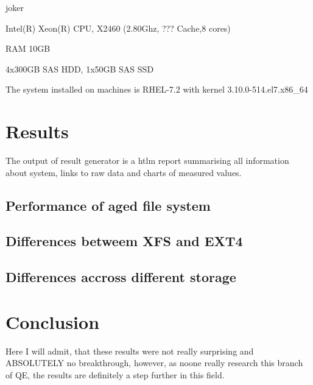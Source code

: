\documentclass[
  color, %
  table, %
  lof,   %
  lot,   %
]{fithesis3}
\begin{document}
\begin{compactenum}
  \item joker
  \item Intel(R) Xeon(R) CPU, X2460 (2.80Ghz, ??? Cache,8 cores)
  \item RAM 10GB
  \item 4x300GB SAS HDD, 1x50GB SAS SSD
\end{compactenum}



The system installed on machines is RHEL-7.2 with kernel 3.10.0-514.el7.x86\_64 

\chapter{Results}
The output of result generator is a htlm report summarising all information about system, links to raw data and charts of measured values.

\section{Performance of aged file system}
\section{Differences betweem XFS and EXT4}
\section{Differences accross different storage}
\chapter{Conclusion}
Here I will admit, that these results were not really surprising and ABSOLUTELY no breakthrough, however, as noone really research this branch of QE, the results are definitely a step further in this field.
\end{document}
